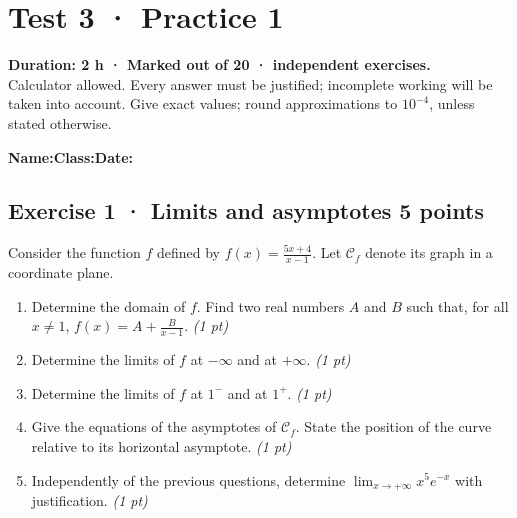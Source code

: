 \mxnewpage{}\label{sujet:4-1}

\section*{Test 3 · Practice 1}


\textbf{Duration: 2 h · Marked out of 20 ·  independent exercises.}\\Calculator allowed. Every answer must be justified; incomplete working will be taken into account. Give exact values; round approximations to $10^{-4}$, unless stated otherwise.

\smallskip\textbf{Name:}\enspace\dotfill\quad\textbf{Class:}\enspace\dotfill\quad\textbf{Date:}\enspace\dotfill

\subsection*{Exercise 1 · Limits and asymptotes \hfill 5 points}Consider the function $f$ defined by $f(x)=\frac{5x+4}{x-1}$. Let $\mathcal C_f$ denote its graph in a coordinate plane.

\begin{enumerate}

\item Determine the domain of $f$. Find two real numbers $A$ and $B$ such that, for all $x\ne1$, $f(x)=A+\frac B{x-1}$. \hfill\textit{(1 pt)}

\item Determine the limits of $f$ at $-\infty$ and at $+\infty$. \hfill\textit{(1 pt)}

\item Determine the limits of $f$ at $1^-$ and at $1^+$. \hfill\textit{(1 pt)}

\item Give the equations of the asymptotes of $\mathcal C_f$. State the position of the curve relative to its horizontal asymptote. \hfill\textit{(1 pt)}

\item Independently of the previous questions, determine $\displaystyle\lim_{x\to+\infty}x^{5}e^{-x}$ with justification. \hfill\textit{(1 pt)}

\end{enumerate}

